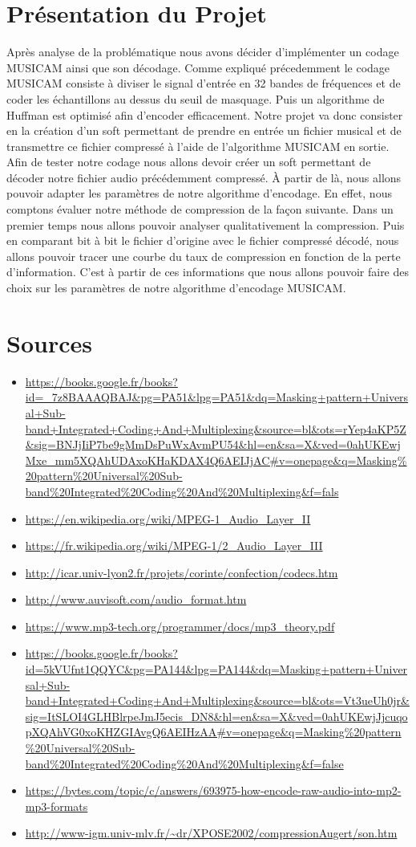 \documentclass[a4paper,10pt, french]{article}
\begin{document}
\section{Présentation du Projet}
 Après analyse de la problématique nous avons décider d'implémenter un codage MUSICAM ainsi que son décodage. Comme expliqué précedemment le codage MUSICAM consiste à diviser le signal d'entrée en 32 bandes de fréquences et de coder les échantillons au dessus du seuil de masquage. Puis un algorithme de Huffman est optimisé afin d'encoder efficacement. Notre projet va donc consister en la création d'un soft permettant de prendre en entrée un fichier musical et de transmettre ce fichier compressé à l'aide de l'algorithme MUSICAM en sortie. Afin de tester notre codage nous allons devoir créer un soft permettant de décoder notre fichier audio précédemment compressé. À partir de là, nous allons pouvoir adapter les paramètres de notre algorithme d'encodage. En effet, nous comptons évaluer notre méthode de compression de la façon suivante. Dans un premier temps nous allons pouvoir analyser qualitativement la compression. Puis en comparant bit à bit le fichier d'origine avec le fichier compressé décodé, nous allons pouvoir tracer une courbe du taux de compression en fonction de la perte d'information. C'est à partir de ces informations que nous allons pouvoir faire des choix sur les paramètres de notre algorithme d'encodage MUSICAM.
 \section{Sources}
 \begin{itemize}
   \item \url{https://books.google.fr/books?id=_7z8BAAAQBAJ&pg=PA51&lpg=PA51&dq=Masking+pattern+Universal+Sub-band+Integrated+Coding+And+Multiplexing&source=bl&ots=rYep4aKP5Z&sig=BNJjIiP7be9gMmDsPuWxAvmPU54&hl=en&sa=X&ved=0ahUKEwjMxe_mm5XQAhUDAxoKHaKDAX4Q6AEIJjAC#v=onepage&q=Masking%20pattern%20Universal%20Sub-band%20Integrated%20Coding%20And%20Multiplexing&f=fals}
   \item \url{https://en.wikipedia.org/wiki/MPEG-1_Audio_Layer_II}
   \item \url{https://fr.wikipedia.org/wiki/MPEG-1/2_Audio_Layer_III}
   \item \url{http://icar.univ-lyon2.fr/projets/corinte/confection/codecs.htm}
   \item \url{http://www.auvisoft.com/audio_format.htm}
   \item \url{https://www.mp3-tech.org/programmer/docs/mp3_theory.pdf}
   \item \url{https://books.google.fr/books?id=5kVUfnt1QQYC&pg=PA144&lpg=PA144&dq=Masking+pattern+Universal+Sub-band+Integrated+Coding+And+Multiplexing&source=bl&ots=Vt3ueUh0jr&sig=ItSLOI4GLHBlrpeJmJ5ecis_DN8&hl=en&sa=X&ved=0ahUKEwjJjcuqopXQAhVG0xoKHZGIAvgQ6AEIHzAA#v=onepage&q=Masking%20pattern%20Universal%20Sub-band%20Integrated%20Coding%20And%20Multiplexing&f=false}
   \item \url{https://bytes.com/topic/c/answers/693975-how-encode-raw-audio-into-mp2-mp3-formats}
   \item \url{http://www-igm.univ-mlv.fr/~dr/XPOSE2002/compressionAugert/son.htm}
 \end{itemize}
\end{document}
